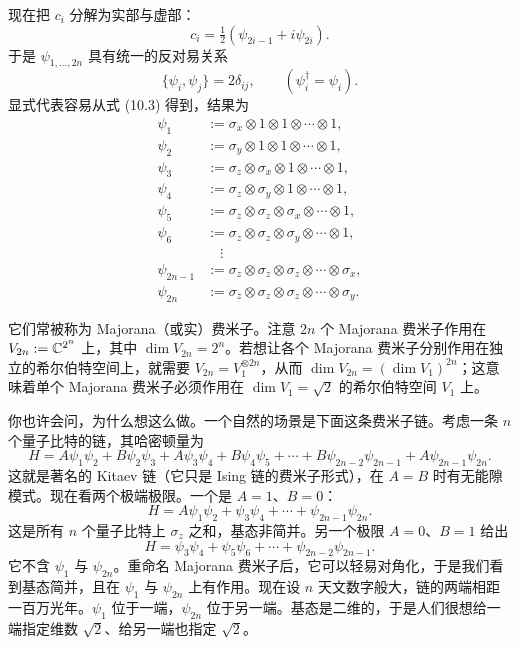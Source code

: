 现在把 $c_i$ 分解为实部与虚部：
\begin{equation}
  c_i=\tfrac12(\psi_{2i-1}+i\psi_{2i}).
  \tag{10.6}
\end{equation}
于是 $\psi_{1,\dots,2n}$ 具有统一的反对易关系
\begin{equation}
  \{\psi_i,\psi_j\}=2\delta_{ij},\qquad(\psi_i^\dagger=\psi_i).
  \tag{10.7}
\end{equation}
显式代表容易从式 (10.3) 得到，结果为
\begin{equation}
  \begin{aligned}
    \psi_1&:=\sigma_x\otimes 1\otimes 1\otimes\cdots\otimes 1,\\
    \psi_2&:=\sigma_y\otimes 1\otimes 1\otimes\cdots\otimes 1,\\
    \psi_3&:=\sigma_z\otimes\sigma_x\otimes 1\otimes\cdots\otimes 1,\\
    \psi_4&:=\sigma_z\otimes\sigma_y\otimes 1\otimes\cdots\otimes 1,\\
    \psi_5&:=\sigma_z\otimes\sigma_z\otimes\sigma_x\otimes\cdots\otimes 1,\\
    \psi_6&:=\sigma_z\otimes\sigma_z\otimes\sigma_y\otimes\cdots\otimes 1,\\
    &\quad\vdots\\
    \psi_{2n-1}&:=\sigma_z\otimes\sigma_z\otimes\sigma_z\otimes\cdots\otimes\sigma_x,\\
    \psi_{2n}&:=\sigma_z\otimes\sigma_z\otimes\sigma_z\otimes\cdots\otimes\sigma_y.
  \end{aligned}
  \tag{10.8}
\end{equation}

它们常被称为 Majorana（或实）费米子。注意 $2n$ 个 Majorana 费米子作用在 $V_{2n}:=\mathbb{C}^{2^n}$ 上，其中 $\dim V_{2n}=2^n$。若想让各个 Majorana 费米子分别作用在独立的希尔伯特空间上，就需要 $V_{2n}=V_1^{\otimes 2n}$，从而 $\dim V_{2n}=(\dim V_1)^{2n}$；这意味着单个 Majorana 费米子必须作用在 $\dim V_1=\sqrt2$ 的希尔伯特空间 $V_1$ 上。

你也许会问，为什么想这么做。一个自然的场景是下面这条费米子链。考虑一条 $n$ 个量子比特的链，其哈密顿量为
\begin{equation}
  H=A\psi_1\psi_2+B\psi_2\psi_3+A\psi_3\psi_4+B\psi_4\psi_5+\cdots
  +B\psi_{2n-2}\psi_{2n-1}+A\psi_{2n-1}\psi_{2n}.
  \tag{10.9}
\end{equation}
这就是著名的 Kitaev 链（它只是 Ising 链的费米子形式），在 $A=B$ 时有无能隙模式。现在看两个极端极限。一个是 $A=1$、$B=0$：
\begin{equation}
  H=A\psi_1\psi_2+\psi_3\psi_4+\cdots+\psi_{2n-1}\psi_{2n}.
  \tag{10.10}
\end{equation}
这是所有 $n$ 个量子比特上 $\sigma_z$ 之和，基态非简并。另一个极限 $A=0$、$B=1$ 给出
\begin{equation}
  H=\psi_3\psi_4+\psi_5\psi_6+\cdots+\psi_{2n-2}\psi_{2n-1}.
  \tag{10.11}
\end{equation}
它不含 $\psi_1$ 与 $\psi_{2n}$。重命名 Majorana 费米子后，它可以轻易对角化，于是我们看到基态简并，且在 $\psi_1$ 与 $\psi_{2n}$ 上有作用。现在设 $n$ 天文数字般大，链的两端相距一百万光年。$\psi_1$ 位于一端，$\psi_{2n}$ 位于另一端。基态是二维的，于是人们很想给一端指定维数 $\sqrt2$、给另一端也指定 $\sqrt2$。


